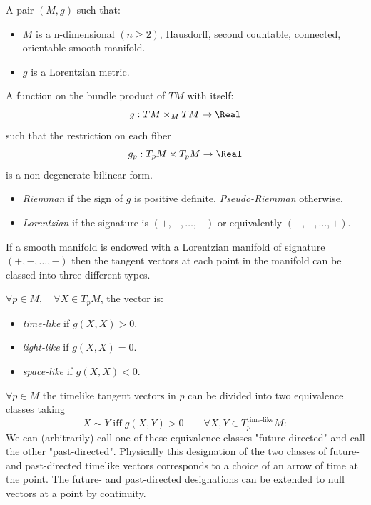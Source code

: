 \documentclass[Main]{subfiles}
\begin{document}
	\begin{definition}
		A pair $(M, g)$ such that:
		\begin{itemize}
			\item $M$ is a n-dimensional $(n\geq2)$, Hausdorff, second countable, connected, orientable smooth manifold.
			\item $g$ is a Lorentzian metric.
		\end{itemize}
	\end{definition}
			
	\begin{definition}[Metric]
		A function on the bundle product of $TM$ with itself: $$g: TM \times_M TM \rightarrow \Real$$ such that the restriction on each fiber $$g_p: T_pM \times T_pM \rightarrow \Real $$ is a non-degenerate bilinear form.
	\end{definition}
	
	\begin{notationfix}
		 \begin{itemize}
		 	\item \emph{Riemman} if the sign of $g$ is positive definite, \emph{Pseudo-Riemman} otherwise.
		 	\item \emph{Lorentzian} if the signature is $(+, -, \ldots,- )$ or equivalently $(-,+,\ldots,+)$.
		 \end{itemize}
	\end{notationfix}

	\begin{observation}
		If a smooth manifold is endowed with a Lorentzian manifold of signature $(+, -, \ldots, -)$ then the tangent vectors at each point in the manifold can be classed into three different types. 
		\begin{notationfix}
			$\forall p \in M, \quad \forall X \in T_pM$, the vector is:
			\begin{itemize}
				\item \emph{time-like} if $g(X,X)>0$.
				\item \emph{light-like} if $g(X,X)=0$.
				\item \emph{space-like} if $g(X,X)<0$.
			\end{itemize}
		\end{notationfix}
	\end{observation}

	\begin{observation}
		$\forall p\in M$ the timelike tangent vectors in $p$ can be divided into two equivalence classes taking
		\begin{displaymath}
			X \sim Y \; \textrm{iff} \; g(X,Y)>0 \qquad \forall X,Y \in T^\textrm{time-like}_pM:
		\end{displaymath}
		We can (arbitrarily) call one of these equivalence classes "future-directed" and call the other "past-directed". Physically this designation of the two classes of future- and past-directed timelike vectors corresponds to a choice of an arrow of time at the point. The future- and past-directed designations can be extended to null vectors at a point by continuity.
	\end{observation}
	
\end{document}
